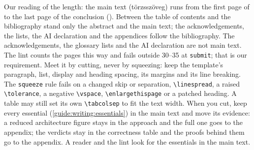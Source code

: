 Our reading of the length: the main text (törzsszöveg) runs from the first page of  to the last page of the conclusion (). Between the table of contents and the bibliography stand only the abstract and the main text; the acknowledgements, the lists, the AI declaration and the appendices follow the bibliography. The acknowledgements, the glossary lists and the AI declaration are not main text. The lint counts the pages this way and fails outside 30--35 at \texttt{submit}; that is our requirement. Meet it by cutting, never by squeezing: keep the template's paragraph, list, display and heading spacing, its margins and its line breaking. The \texttt{squeeze} rule fails on a changed skip or separation, \texttt{\textbackslash linespread}, a raised \texttt{\textbackslash tolerance}, a negative \texttt{\textbackslash vspace}, \texttt{\textbackslash enlargethispage} or a patched heading. A table may still set its own \texttt{\textbackslash tabcolsep} to fit the text width. When you cut, keep every essential (\cref{guide:writing:essentials}) in the main text and move its evidence: a reduced architecture figure stays in the approach and the full one goes to the appendix; the verdicts stay in the correctness table and the proofs behind them go to the appendix. A reader and the lint look for the essentials in the main text.

